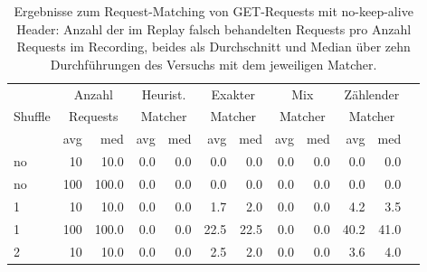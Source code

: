 \documentclass[12pt,a4paper]{report}
\begin{document}
\begin{table}[H]
	\centering
	\caption[Ergebnisse zum Request-Matching von GET-Requests mit no-keep-alive Header]{
		Ergebnisse zum Request-Matching von GET-Requests mit no-keep-alive Header:
		Anzahl der im Replay falsch behandelten Requests pro Anzahl Requests im Recording,
		beides als Durchschnitt und Median über zehn Durchführungen des Versuchs mit dem jeweiligen Matcher.
	}
	\label{tab:get_nka}
	\begin{tabular}{|l|r|r|r|r|r|r|r|r|r|r|r|}
		\hline
		\multirow{3}{*}{Shuffle} & \multicolumn{2}{|c|}{Anzahl}   & \multicolumn{2}{|c|}{Heurist.} & \multicolumn{2}{|c|}{Exakter} & \multicolumn{2}{|c|}{Mix}     & \multicolumn{2}{|c|}{Zählender}                                  \\
		                         & \multicolumn{2}{|c|}{Requests} & \multicolumn{2}{|c|}{Matcher}  & \multicolumn{2}{|c|}{Matcher} & \multicolumn{2}{|c|}{Matcher} & \multicolumn{2}{|c|}{Matcher}                                    \\ \cline{2-11}
		                         & avg                            & med                            & avg                           & med                           & avg                             & med  & avg & med & avg  & med  \\ \hline
		no                       & 10                             & 10.0                           & 0.0                           & 0.0                           & 0.0                             & 0.0  & 0.0 & 0.0 & 0.0  & 0.0  \\ \hline
		no                       & 100                            & 100.0                          & 0.0                           & 0.0                           & 0.0                             & 0.0  & 0.0 & 0.0 & 0.0  & 0.0  \\ \hline
		1                        & 10                             & 10.0                           & 0.0                           & 0.0                           & 1.7                             & 2.0  & 0.0 & 0.0 & 4.2  & 3.5  \\ \hline
		1                        & 100                            & 100.0                          & 0.0                           & 0.0                           & 22.5                            & 22.5 & 0.0 & 0.0 & 40.2 & 41.0 \\ \hline
		2                        & 10                             & 10.0                           & 0.0                           & 0.0                           & 2.5                             & 2.0  & 0.0 & 0.0 & 3.6  & 4.0  \\ \hline

\end{tabular}
\end{table}
\end{document}
